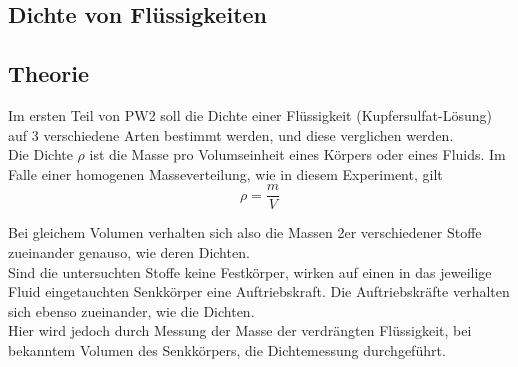 \documentclass[12pt,a4paper]{article}
\begin{document}
\begin{multicols}{2}
\section{Dichte von Flüssigkeiten}

\subsection{Theorie}

Im ersten Teil von PW2 soll die Dichte einer Flüssigkeit (Kupfersulfat-Lösung) auf 3 verschiedene Arten bestimmt werden, und diese verglichen werden.\\
Die Dichte $\rho$ ist die Masse pro Volumseinheit eines Körpers oder eines Fluids. Im Falle einer homogenen Masseverteilung, wie in diesem Experiment, gilt
$$\rho = \frac{m}{V}$$

Bei gleichem Volumen verhalten sich also die Massen 2er verschiedener Stoffe zueinander genauso, wie deren Dichten.\\
Sind die untersuchten Stoffe keine Festkörper, wirken auf einen in das jeweilige Fluid eingetauchten Senkkörper eine Auftriebskraft. Die Auftriebskräfte verhalten sich ebenso zueinander, wie die Dichten.\\
Hier wird jedoch durch Messung der Masse der verdrängten Flüssigkeit, bei bekanntem Volumen des Senkkörpers, die Dichtemessung durchgeführt.





\end{multicols}
\end{document}

